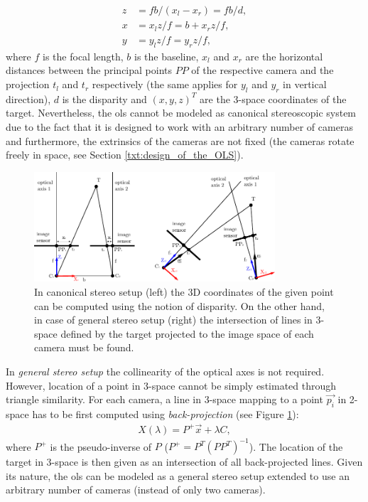 \begin{align}
	z &= fb/(x_{l} - x_{r}) = fb/d,\\
	x &= x_{l}z/f = b + x_{r}z/f,\\
	y &= y_{l}z/f = y_{r}z/f,
\end{align}
where $f$ is the focal length, $b$ is the baseline, $x_{l}$ and $x_{r}$ are the horizontal distances between the principal points $PP$ of the respective camera and the projection $t_{l}$ and $t_{r}$ respectively (the same applies for $y_{l}$ and $y_{r}$ in vertical direction), $d$ is the disparity and $(x, y, z)^{T}$ are the 3-space coordinates of the target. Nevertheless, the \gls{ols} cannot be modeled as canonical stereoscopic system due to the fact that it is designed to work with an arbitrary number of cameras and furthermore, the extrinsics of the cameras are not fixed (the cameras rotate freely in space, see Section \ref{txt:design_of_the_OLS}).

\begin{figure}[tbh]
	\centering
	\includegraphics[width=0.8\textwidth]{fig/canonical_stereo_vs_general_stereo.pdf}
	\caption{In canonical stereo setup (left) the 3D coordinates of the given point can be computed using the notion of disparity. On the other hand, in case of general stereo setup (right) the intersection of lines in 3-space defined by the target projected to the image space of each camera must be found.}
	\label{fig:canonical_vs_general_stereo}
\end{figure}

In \textit{general stereo setup} the collinearity of the optical axes is not required. However, location of a point in 3-space cannot be simply estimated through triangle similarity. For each camera, a line in 3-space mapping to a point $\vec{p_{i}}$ in 2-space has to be first computed using \textit{back-projection} (see Figure \ref{fig:canonical_vs_general_stereo}):
\begin{align}
	X(\lambda) = P^{+}\vec{x} + \lambda C,
\end{align}
where $P^{+}$ is the pseudo-inverse of $P$ ($P^{+} = P^{T}(PP^{T})^{-1}$). The location of the target in 3-space is then given as an intersection of all back-projected lines. Given its nature, the \gls{ols} can be modeled as a general stereo setup extended to use an arbitrary number of cameras (instead of only two cameras).

